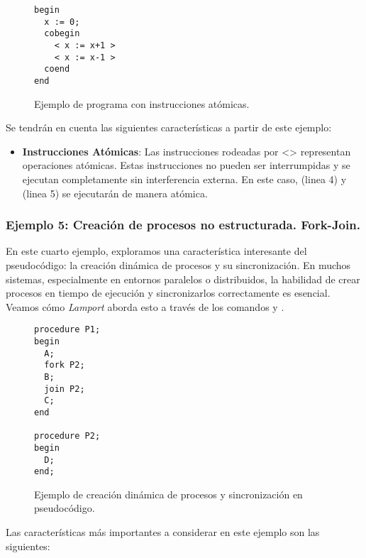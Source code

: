 \begin{figure}[h]
\begin{lstlisting}[style=lamportStyle]
begin
  x := 0;
  cobegin
    < x := x+1 >
    < x := x-1 >
  coend
end
\end{lstlisting}
\caption{Ejemplo de programa con instrucciones atómicas.}
\label{fig:ejemplo4}
\end{figure}

\newpage 

Se tendrán en cuenta las siguientes características a partir de este ejemplo:

\begin{itemize}
    \item \textbf{Instrucciones Atómicas}: Las instrucciones rodeadas por \textless \textgreater \hspace{0.1cm} representan operaciones atómicas. Estas instrucciones no pueden ser interrumpidas y se ejecutan completamente sin interferencia externa. En este caso,  (linea 4) y  (linea 5) se ejecutarán de manera atómica.
\end{itemize}

\subsubsection{Ejemplo 5: Creación de procesos no estructurada. Fork-Join.}\label{subsubsec:pseudoAnalisisEjemplo5}
En este cuarto ejemplo, exploramos una característica interesante del pseudocódigo: la creación dinámica de procesos y su sincronización. En muchos sistemas, especialmente en entornos paralelos o distribuidos, la habilidad de crear procesos en tiempo de ejecución y sincronizarlos correctamente es esencial. Veamos cómo \textit{Lamport} aborda esto a través de los comandos  y .

\begin{figure}[h]
\begin{lstlisting}[style=lamportStyle]
procedure P1;
begin
  A;
  fork P2;
  B;
  join P2;
  C;
end

procedure P2;
begin
  D;
end;
\end{lstlisting}
\caption{Ejemplo de creación dinámica de procesos y sincronización en pseudocódigo.}
\label{fig:ejemplo5}
\end{figure}

Las características más importantes a considerar en este ejemplo son las siguientes:

